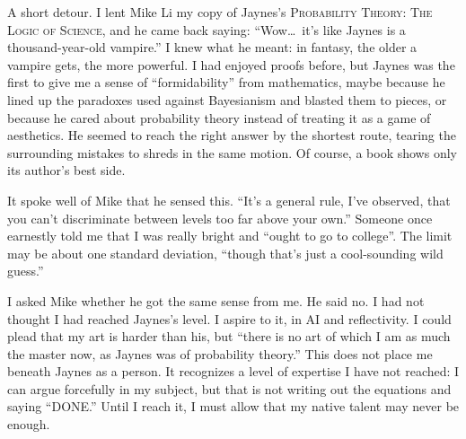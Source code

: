
A short detour. I lent Mike Li my copy of Jaynes's \textsc{Probability Theory: The Logic of Science}, and he came back saying: ``Wow\ldots\ it's like Jaynes is a thousand-year-old vampire.'' I knew what he meant: in fantasy, the older a vampire gets, the more powerful. I had enjoyed proofs before, but Jaynes was the first to give me a sense of ``formidability'' from mathematics, maybe because he lined up the paradoxes used against Bayesianism and blasted them to pieces, or because he cared about probability theory instead of treating it as a game of aesthetics. He seemed to reach the right answer by the shortest route, tearing the surrounding mistakes to shreds in the same motion.  Of course, a book shows only its author's best side. 

It spoke well of Mike that he sensed this. ``It's a general rule, I've observed, that you can't discriminate between levels too far above your own.'' Someone once earnestly told me that I was really bright and ``ought to go to college''. The limit may be about one standard deviation, ``though that's just a cool-sounding wild guess.'' 

I asked Mike whether he got the same sense from me. He said no. I had not thought I had reached Jaynes's level. I aspire to it, in AI and reflectivity. I could plead that my art is harder than his, but ``there is no art of which I am as much the master now, as Jaynes was of probability theory.'' This does not place me beneath Jaynes as a person. It recognizes a level of expertise I have not reached: I can argue forcefully in my subject, but that is not writing out the equations and saying ``DONE.'' Until I reach it, I must allow that my native talent may never be enough.

